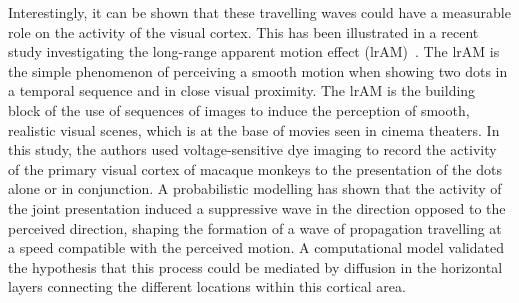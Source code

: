 \documentclass[brainsci, %
               review,submit,pdftex,moreauthors
               ]{Definitions/mdpi}
\begin{document}
Interestingly, it can be shown that these travelling waves could have a measurable role on the activity of the visual cortex. This has been illustrated in a recent study investigating the long-range apparent motion effect (lrAM)~\citep{chemla_suppressive_2019}. The lrAM is the simple phenomenon of perceiving a smooth motion when showing two dots in a temporal sequence and in close visual proximity. The lrAM is the building block of the use of sequences of images to induce the perception of smooth, realistic visual scenes, which is at the base of movies seen in cinema theaters. In this study, the authors used voltage-sensitive dye imaging to record the activity of the primary visual cortex of macaque monkeys to the presentation of the dots alone or in conjunction. A probabilistic modelling has shown that the activity of the joint presentation induced a suppressive wave in the direction opposed to the perceived direction, shaping the formation of a wave of propagation travelling at a speed compatible with the perceived motion. A computational model validated the hypothesis that this process could be mediated by diffusion in the horizontal layers connecting the different locations within this cortical area.
%
%
\end{document}
